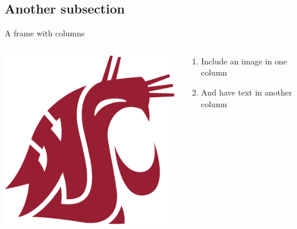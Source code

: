 \documentclass{beamer}
\begin{document}
\subsection{Another subsection}

\begin{frame}{A frame with columns}

 \begin{columns}
  \begin{column}{0.5\textwidth}
   \begin{center}
    \includegraphics[width=1\textwidth]{wsu-emblem}
   \end{center}
  \end{column}

  \begin{column}{0.45\textwidth}  %
   \begin{enumerate}
    \item Include an image in one column
    \item And have text in another column
   \end{enumerate}
  \end{column}
 \end{columns}

\end{frame}
\end{document}
